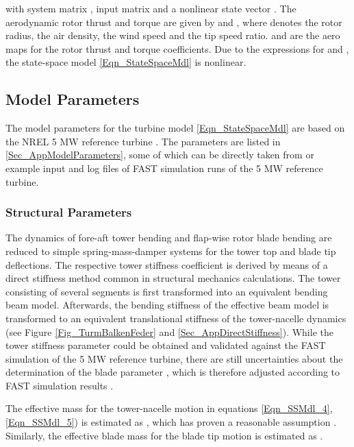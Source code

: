 \documentclass[a4paper]{article}
\begin{document}
\newline with system matrix , input matrix  and a nonlinear state vector .
\newline The aerodynamic rotor thrust and torque are given by  and
\newline , where  denotes the rotor radius,  the air density,
 the wind speed and  the tip speed ratio.  and  are the aero maps for the rotor thrust and torque coefficients.
Due to the expressions for  and , the state-space model \eqref{Eqn_StateSpaceMdl} is nonlinear.



\subsection{\label{Sec_ModelParameters}Model Parameters}

The model parameters for the turbine model \eqref{Eqn_StateSpaceMdl} are based on the NREL 5 MW reference turbine \cite{Jonkman:2009}. The parameters are listed in \ref{Sec_AppModelParameters}, some of which can be directly taken from \cite{Jonkman:2009} or example input and log files of FAST simulation runs of the 5 MW reference turbine.



\subsubsection{\label{Sec_StructParameters}Structural Parameters}

The dynamics of fore-aft tower bending and flap-wise rotor blade bending are reduced to simple spring-mass-damper systems for the tower top and blade tip deflections. The respective tower stiffness coefficient  is derived by means of a direct stiffness method common in structural mechanics calculations. The tower consisting of several segments is first transformed into an equivalent bending beam model. Afterwards, the bending stiffness of the effective beam model is transformed to an equivalent translational stiffness of the tower-nacelle dynamics (see Figure \ref{Fig_TurmBalkenFeder} and \ref{Sec_AppDirectStiffness}).
\newline While the tower stiffness parameter could be obtained and validated against the FAST simulation of the 5 MW reference turbine, there are still uncertainties about the determination of the blade parameter , which is therefore adjusted according to FAST simulation results \cite{Georg:Fuzz2012}.

The effective mass  for the tower-nacelle motion in equations \eqref{Eqn_SSMdl_4}, \eqref{Eqn_SSMdl_5}) is estimated as
\newline , which has proven a reasonable assumption \cite{Gasch_eng:2012}. Similarly, the effective blade mass for the blade tip motion is estimated as .
\end{document}
